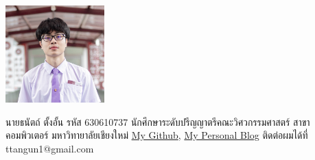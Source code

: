 \documentclass[semifinal]{cpecmu}
\author{ธนัตถ์ ตั้งอั้น}{Tanat Tangun}{630610737}
\author{ธนวัตน์ บำเพ็งพันธุ์}{Thanawat Bumpengpun}{630610736}
\begin{document}


\pagestyle{empty}\cleardoublepage
\normalspacing \setcounter{page}{1}  \pagestyle{cpecmu}





\ifproject

\fi



\normalspacing
\appendix


\ifproject
\ifglossary\glossarypage\fi

\ifindex\indexpage\fi

\begin{biosketch}
\begin{center}
  \includegraphics[width=1.5in]{images/tanat.jpg}
\end{center}
นายธนัตถ์ ตั้งอั้น รหัส 630610737 นักศึกษาระดับปรีญญาตรีคณะวิศวกรรมศาสตร์ สาขาคอมพิวเตอร์ มหาวิทายาลัยเชียงใหม่
\href{https://github.com/RiwEZ}{My Github}, \href{https://riwez.github.io/TanatBlog/}{My Personal Blog} ติดต่อผมได้ที่ ttangun1@gmail.com

\end{biosketch}
\fi %
\end{document}
